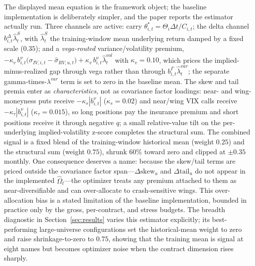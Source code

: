 \begin{remark}\label{rem:implemented_mu}
The displayed mean equation is the framework object; the baseline implementation is
deliberately simpler, and the paper reports the estimator actually run. Three channels are
active: carry \(\theta^{\ast}_{i,t}=\Theta_i\Delta t/C_{i,t}\); the delta channel
\(b^\Delta_{i,t}\widehat\lambda^{S}_t\), with \(\widehat\lambda^{S}_t\) the training-window
mean underlying return damped by a fixed scale (\(0.35\)); and a \emph{vega-routed}
variance/volatility premium,
\(-\kappa_v\,b^\nu_{i,t}\bigl(\sigma_{IV,i,t}-\widehat\sigma_{RV,u,t}\bigr)
+\kappa_v\,b^\nu_{i,t}\widehat\lambda^{vol}_t\) with \(\kappa_v=0.10\), which prices the
implied-minus-realized gap through vega rather than through
\(b^\Gamma_{i,t}\widehat\lambda^{var}_t\); the separate gamma-times-\(\lambda^{var}\) term
is set to zero in the baseline mean. The skew and tail premia enter as
\emph{characteristics}, not as covariance factor loadings: near- and wing-moneyness puts
receive \(-\kappa_s|b^\nu_{i,t}|\) (\(\kappa_s=0.02\)) and near/wing VIX calls receive
\(-\kappa_\tau|b^\nu_{i,t}|\) (\(\kappa_\tau=0.015\)), so long positions pay the insurance
premium and short positions receive it through negative \(q\); a small relative-value tilt
on the per-underlying implied-volatility z-score completes the structural sum. The
combined signal is a fixed blend of the training-window historical mean (weight \(0.25\))
and the structural sum (weight \(0.75\)), shrunk \(60\%\) toward zero and clipped at
\(\pm0.35\) monthly. One consequence deserves a name: because the skew/tail terms are
priced outside the covariance factor span---\(\Delta\mathrm{skew}_u\) and
\(\Delta\mathrm{tail}_u\) do not appear in the implemented \(\widehat\Omega_t\)---the
optimizer treats any premium attached to them as near-diversifiable and can over-allocate
to crash-sensitive wings. This over-allocation bias is a stated limitation of the baseline
implementation, bounded in practice only by the gross, per-contract, and stress budgets.
The breadth diagnostic in Section~\ref{sec:results} varies this estimator explicitly; its
best-performing large-universe configurations set the historical-mean weight to zero and
raise shrinkage-to-zero to \(0.75\), showing that the training mean is signal at eight
names but becomes optimizer noise when the contract dimension rises sharply.
\end{remark}

